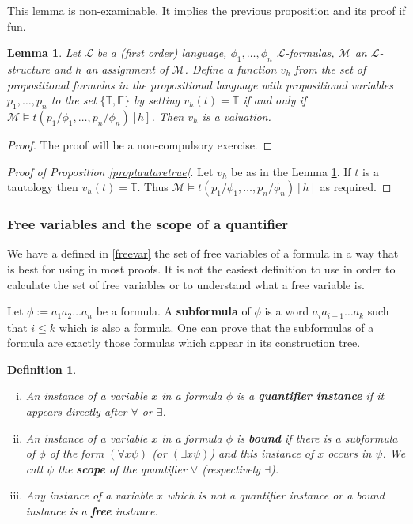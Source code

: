 \documentclass[11pt]{article}
\newtheorem{definition}[theorem]{Definition}
\newtheorem{lemma}[theorem]{Lemma}
\newcommand{\mcal}[1]{\mathcal{#1}}
\newcommand{\F}{\mathbb{F}}
\newcommand{\T}{\mathbb{T}}
\begin{document}
This lemma is non-examinable. It implies the previous proposition and its proof if fun.
\begin{lemma}\label{propvalfrompred}
Let $\mcal{L}$ be a (first order) language, $\phi_1,\ldots,\phi_n$ $\mcal{L}$-formulas, $\mcal{M}$ an $\mcal{L}$-structure and $h$ an assignment of $\mcal{M}$.  Define a function $v_h$ from the set of propositional formulas in the propositional language with propositional variables $p_1,\ldots,p_n$ to the set $\{\T,\F\}$ by setting $v_h(t)=\T$ if and only if $\mcal{M}\models t(p_1/\phi_1,\ldots,p_n/\phi_n)[h]$. Then $v_h$ is a valuation.
\end{lemma}
\begin{proof}
The proof will be a non-compulsory exercise.
\end{proof}


\begin{proof}[Proof of Proposition \ref{proptautaretrue}]
Let $v_h$ be as in the Lemma \ref{propvalfrompred}. If $t$ is a tautology then $v_h(t)=\T$. Thus $\mcal{M}\models t(p_1/\phi_1,\ldots,p_n/\phi_n)[h]$ as required.
\end{proof}

\subsubsection*{Free variables and the scope of a quantifier}
We have a defined in \ref{freevar} the set of free variables of a formula in a way that is best for using in most proofs. It is not the easiest definition to use in order to calculate the set of free variables or to understand what a free variable is.

Let $\phi:=a_1a_2\ldots a_n$ be a formula. A \textbf{subformula} of $\phi$ is a word $a_ia_{i+1}\ldots a_k$ such that $i\leq k$ which is also a formula. One can prove that the subformulas of a formula are exactly those formulas which appear in its construction tree.

\begin{definition}
\
\begin{enumerate}[(i)]
\item An instance of a variable $x$ in a formula $\phi$ is a \textbf{quantifier instance} if it appears directly after $\forall$ or $\exists$.
\item An instance of a variable $x$ in a formula $\phi$ is \textbf{bound} if there is a subformula of $\phi$ of the form $(\forall x \psi)$ (or $(\exists x \psi)$) and this instance of $x$ occurs in $\psi$. We call $\psi$ the \textbf{scope} of the quantifier $\forall$ (respectively $\exists$).
\item  Any instance of a variable $x$ which is not a quantifier instance or a bound instance is a \textbf{free} instance.
\end{enumerate}
\end{definition}
\end{document}
